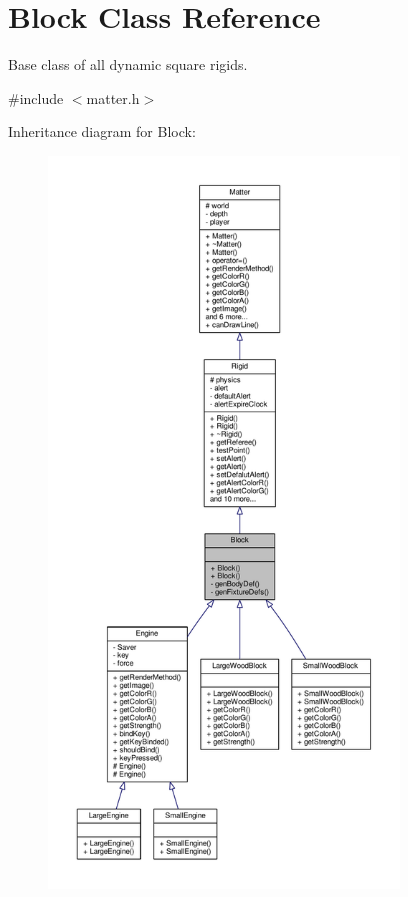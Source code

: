 \hypertarget{classBlock}{}\section{Block Class Reference}
\label{classBlock}


Base class of all dynamic square rigids.  




{\ttfamily \#include $<$matter.\+h$>$}



Inheritance diagram for Block\+:
\nopagebreak
\begin{figure}[H]
\begin{center}
\leavevmode
\includegraphics[height=550pt]{classBlock__inherit__graph}
\end{center}
\end{figure}


